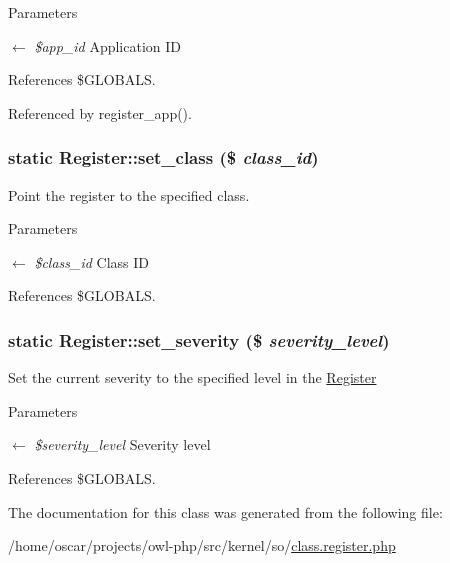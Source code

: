 \begin{DoxyParams}{Parameters}
\item[\mbox{$\leftarrow$} {\em \$app\_\-id}]Application ID \end{DoxyParams}


References \$GLOBALS.



Referenced by register\_\-app().

\subsubsection[{set\_\-class}]{\setlength{\rightskip}{0pt plus 5cm}static Register::set\_\-class (\$ {\em class\_\-id})}\label{classRegister_a58e49ccb1fe4e441d0329e879c922aa0}
Point the register to the specified class.


\begin{DoxyParams}{Parameters}
\item[\mbox{$\leftarrow$} {\em \$class\_\-id}]Class ID \end{DoxyParams}


References \$GLOBALS.

\subsubsection[{set\_\-severity}]{\setlength{\rightskip}{0pt plus 5cm}static Register::set\_\-severity (\$ {\em severity\_\-level})}\label{classRegister_a0adde8d67d77b9b4d66156272cb48ae4}
Set the current severity to the specified level in the \hyperlink{classRegister}{Register}


\begin{DoxyParams}{Parameters}
\item[\mbox{$\leftarrow$} {\em \$severity\_\-level}]Severity level \end{DoxyParams}


References \$GLOBALS.



The documentation for this class was generated from the following file:\begin{DoxyCompactItemize}
\item 
/home/oscar/projects/owl-\/php/src/kernel/so/\hyperlink{class_8register_8php}{class.register.php}\end{DoxyCompactItemize}
